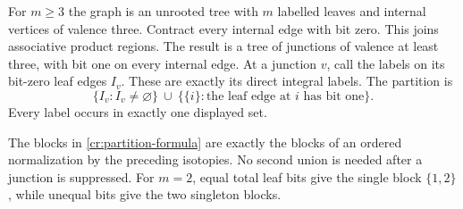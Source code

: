 For $m\ge3$ the graph is an unrooted tree with $m$ labelled leaves and internal vertices of valence three. Contract every internal edge with bit zero. This joins associative product regions. The result is a tree of junctions of valence at least three, with bit one on every internal edge. At a junction $v$, call the labels on its bit-zero leaf edges $I_v$. These are exactly its direct integral labels. The partition is
\begin{equation}\label{cr:partition-formula}
 \{I_v:I_v\ne\varnothing\}\ \cup\
 \{\{i\}:\text{the leaf edge at }i\text{ has bit one}\}.
\end{equation}
Every label occurs in exactly one displayed set.

\begin{proposition}\label{cr:blocks}
The blocks in \eqref{cr:partition-formula} are exactly the blocks of an ordered normalization by the preceding isotopies. No second union is needed after a junction is suppressed. For $m=2$, equal total leaf bits give the single block $\{1,2\}$, while unequal bits give the two singleton blocks.
\end{proposition}
